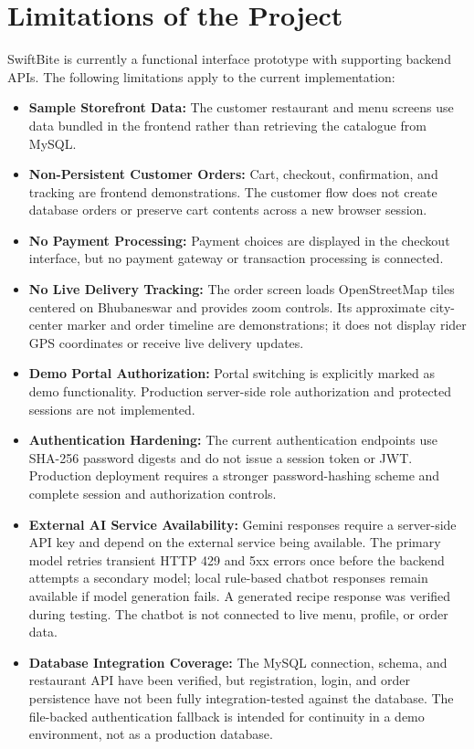\chapter{Limitations of the Project}

SwiftBite is currently a functional interface prototype with supporting backend APIs. The following limitations apply to the current implementation:

\begin{itemize}

\item \textbf{Sample Storefront Data:}
The customer restaurant and menu screens use data bundled in the frontend rather than retrieving the catalogue from MySQL.

\item \textbf{Non-Persistent Customer Orders:}
Cart, checkout, confirmation, and tracking are frontend demonstrations. The customer flow does not create database orders or preserve cart contents across a new browser session.

\item \textbf{No Payment Processing:}
Payment choices are displayed in the checkout interface, but no payment gateway or transaction processing is connected.

\item \textbf{No Live Delivery Tracking:}
The order screen loads OpenStreetMap tiles centered on Bhubaneswar and provides zoom controls. Its approximate city-center marker and order timeline are demonstrations; it does not display rider GPS coordinates or receive live delivery updates.

\item \textbf{Demo Portal Authorization:}
Portal switching is explicitly marked as demo functionality. Production server-side role authorization and protected sessions are not implemented.

\item \textbf{Authentication Hardening:}
The current authentication endpoints use SHA-256 password digests and do not issue a session token or JWT. Production deployment requires a stronger password-hashing scheme and complete session and authorization controls.

\item \textbf{External AI Service Availability:}
Gemini responses require a server-side API key and depend on the external service being available. The primary model retries transient HTTP 429 and 5xx errors once before the backend attempts a secondary model; local rule-based chatbot responses remain available if model generation fails. A generated recipe response was verified during testing. The chatbot is not connected to live menu, profile, or order data.

\item \textbf{Database Integration Coverage:}
The MySQL connection, schema, and restaurant API have been verified, but registration, login, and order persistence have not been fully integration-tested against the database. The file-backed authentication fallback is intended for continuity in a demo environment, not as a production database.

\end{itemize}
